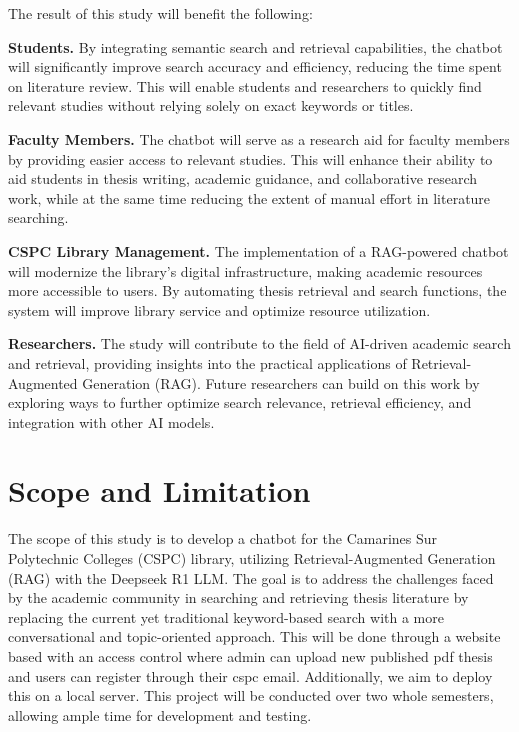 \begin{refsection}
The result of this study will benefit the following:

\bigbreak
\noindent \textbf{Students.}  By integrating semantic search and retrieval capabilities, the chatbot will significantly improve search accuracy and efficiency, reducing the time spent on literature review. This will enable students and researchers to quickly find relevant studies without relying solely on exact keywords or titles.

\bigbreak
\noindent \textbf{Faculty Members.}  The chatbot will serve as a research aid for faculty members by providing easier access to relevant studies. This will enhance their ability to aid students in thesis writing, academic guidance, and collaborative research work, while at the same time reducing the extent of manual effort in literature searching.

\bigbreak
\noindent \textbf{CSPC Library Management.} The implementation of a RAG-powered chatbot will modernize the library’s digital infrastructure, making academic resources more accessible to users. By automating thesis retrieval and search functions, the system will improve library service and optimize resource utilization.

\bigbreak
\noindent \textbf{Researchers.} The study will contribute to the field of AI-driven academic search and retrieval, providing insights into the practical applications of Retrieval-Augmented Generation (RAG). Future researchers can build on this work by exploring ways to further optimize search relevance, retrieval efficiency, and integration with other AI models.

\section{Scope and Limitation}

\hspace{1cm}The scope of this study is to develop a chatbot for the Camarines Sur Polytechnic Colleges (CSPC) library, utilizing Retrieval-Augmented Generation (RAG) with the Deepseek R1 LLM. The goal is to address the challenges faced by the academic community in searching and retrieving thesis literature by replacing the current yet traditional keyword-based search with a more conversational and topic-oriented approach. This will be done through a website based with an access control where admin can upload new published pdf thesis and users can register through their cspc email. Additionally, we aim to deploy this on a local server. This project will be conducted over two whole semesters, allowing ample time for development and testing.


\end{refsection}
